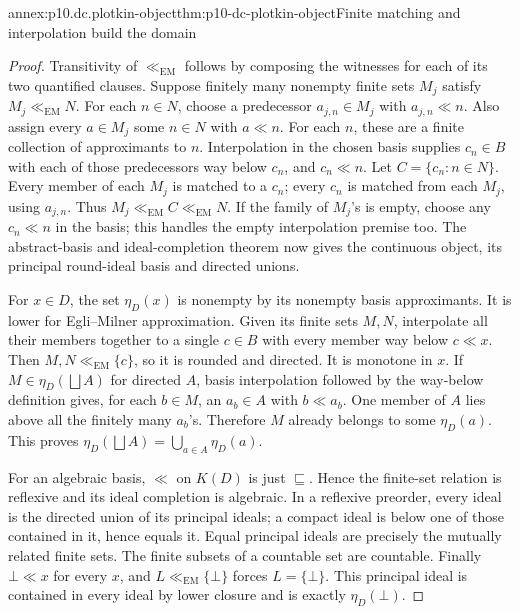 \begin{annexitem}{annex:p10.dc.plotkin-object}{thm:p10-dc-plotkin-object}{Finite matching and interpolation build the domain}
\begin{proof}
Transitivity of \(\ll_{\mathrm{EM}}\) follows by composing the
witnesses for each of its two quantified clauses.
Suppose finitely many nonempty finite sets \(M_j\) satisfy
\(M_j\ll_{\mathrm{EM}}N\). For each \(n\in N\), choose a predecessor
\(a_{j,n}\in M_j\) with \(a_{j,n}\ll n\). Also assign every
\(a\in M_j\) some \(n\in N\) with \(a\ll n\). For each \(n\),
these are a finite collection of approximants to \(n\). Interpolation
in the chosen basis supplies \(c_n\in B\) with each of those
predecessors way below \(c_n\), and \(c_n\ll n\).
Let \(C=\{c_n:n\in N\}\). Every member of each \(M_j\) is matched
to a \(c_n\); every \(c_n\) is matched from each \(M_j\), using
\(a_{j,n}\). Thus \(M_j\ll_{\mathrm{EM}}C\ll_{\mathrm{EM}}N\).
If the family of \(M_j\)'s is empty, choose any \(c_n\ll n\) in
the basis; this handles the empty interpolation premise too.
The abstract-basis and ideal-completion theorem now gives the continuous
object, its principal round-ideal basis and directed unions.

For \(x\in D\), the set \(\eta_D(x)\) is nonempty by its nonempty
basis approximants. It is lower for Egli--Milner approximation.
Given its finite sets \(M,N\), interpolate all their members together
to a single \(c\in B\) with every member way below \(c\ll x\).
Then \(M,N\ll_{\mathrm{EM}}\{c\}\), so it is rounded and directed.
It is monotone in \(x\). If \(M\in\eta_D(\bigsqcup A)\) for
directed \(A\), basis interpolation followed by the way-below definition
gives, for each \(b\in M\), an \(a_b\in A\) with \(b\ll a_b\).
One member of \(A\) lies above all the finitely many \(a_b\)'s.
Therefore \(M\) already belongs to some \(\eta_D(a)\). This proves
\(\eta_D(\bigsqcup A)=\bigcup_{a\in A}\eta_D(a)\).

For an algebraic basis, \(\ll\) on \(K(D)\) is just \(\sqsubseteq\).
Hence the finite-set relation is reflexive and its ideal completion is
algebraic. In a reflexive preorder, every ideal is the directed union
of its principal ideals; a compact ideal is below one of those contained
in it, hence equals it. Equal principal ideals are precisely the
mutually related finite sets. The finite subsets of a countable set are
countable. Finally \(\bot\ll x\) for every \(x\), and
\(L\ll_{\mathrm{EM}}\{\bot\}\) forces \(L=\{\bot\}\).
This principal ideal is contained in every ideal by lower closure and
is exactly \(\eta_D(\bot)\).
\end{proof}
\end{annexitem}


